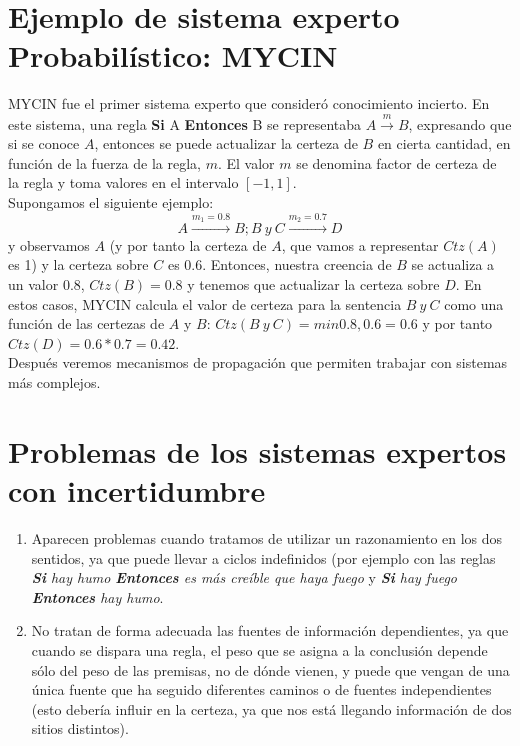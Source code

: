 \documentclass{article}
\theoremstyle{definition_wo_parentheses}
\begin{document}
\section{Ejemplo de sistema experto Probabilístico: MYCIN}
MYCIN fue el primer sistema experto que consideró conocimiento incierto. En este sistema, una regla \textbf{Si} A \textbf{Entonces} B se representaba $A \overset{m}{\rightarrow}B$, expresando que si se conoce $A$, entonces se puede actualizar la certeza de $B$ en cierta cantidad, en función de la fuerza de la regla, $m$. El valor $m$ se denomina factor de certeza de la regla y toma valores en el intervalo $[-1,1]$.\\

Supongamos el siguiente ejemplo:
\[A \overset{m_1=0.8}{\longrightarrow} B ; B\ y\ C \overset{m_2=0.7}{\longrightarrow} D
\]
y observamos $A$ (y por tanto la certeza de $A$, que vamos a representar $Ctz(A)$ es 1) y la certeza sobre $C$ es 0.6. Entonces, nuestra creencia de $B$ se actualiza a un valor 0.8, $Ctz(B)=0.8$ y tenemos que actualizar la certeza sobre $D$. En estos casos, MYCIN calcula el valor de certeza para la sentencia $B\ y \ C$ como una función de las certezas de $A$ y $B$: $Ctz(B\ y\ C) = min{0.8,0.6}=0.6$ y por tanto $Ctz(D)=0.6*0.7=0.42$.\\
Después veremos mecanismos de propagación que permiten trabajar con sistemas más complejos.

\section{Problemas de los sistemas expertos con incertidumbre}
\begin{enumerate}
    \item Aparecen problemas cuando tratamos de utilizar un razonamiento en los dos sentidos, ya que puede llevar a ciclos indefinidos (por ejemplo con las reglas \textit{\textbf{Si} hay humo \textbf{Entonces} es más creíble que haya fuego} y \textit{\textbf{Si} hay fuego \textbf{Entonces} hay humo}.
    \item No tratan de forma adecuada las fuentes de información dependientes, ya que cuando se dispara una regla, el peso que se asigna a la conclusión depende sólo del peso de las premisas, no de dónde vienen, y puede que vengan de una única fuente que ha seguido diferentes caminos o de fuentes independientes (esto debería influir en la certeza, ya que nos está llegando información de dos sitios distintos).
\end{enumerate}
\end{document}
